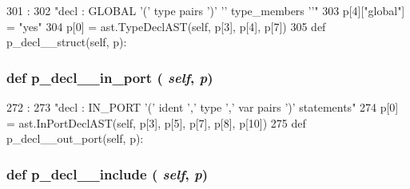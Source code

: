 \begin{DoxyCode}
301                                :
302         "decl : GLOBAL '(' type pairs ')' '{' type_members '}'"
303         p[4]["global"] = "yes"
304         p[0] = ast.TypeDeclAST(self, p[3], p[4], p[7])
305 
    def p_decl__struct(self, p):
\end{DoxyCode}
\hypertarget{classslicc_1_1parser_1_1SLICC_abe9e2277900b5c9140a0a4da0df3b315}{
\subsubsection[{p\_\-decl\_\-\_\-in\_\-port}]{\setlength{\rightskip}{0pt plus 5cm}def p\_\-decl\_\-\_\-in\_\-port ( {\em self}, \/   {\em p})}}
\label{classslicc_1_1parser_1_1SLICC_abe9e2277900b5c9140a0a4da0df3b315}



\begin{DoxyCode}
272                                 :
273         "decl : IN_PORT '(' ident ',' type ',' var pairs ')' statements"
274         p[0] = ast.InPortDeclAST(self, p[3], p[5], p[7], p[8], p[10])
275 
    def p_decl__out_port(self, p):
\end{DoxyCode}
\hypertarget{classslicc_1_1parser_1_1SLICC_a940a2cf761e10963f0975d3f271cf3b7}{
\subsubsection[{p\_\-decl\_\-\_\-include}]{\setlength{\rightskip}{0pt plus 5cm}def p\_\-decl\_\-\_\-include ( {\em self}, \/   {\em p})}}
\label{classslicc_1_1parser_1_1SLICC_a940a2cf761e10963f0975d3f271cf3b7}



